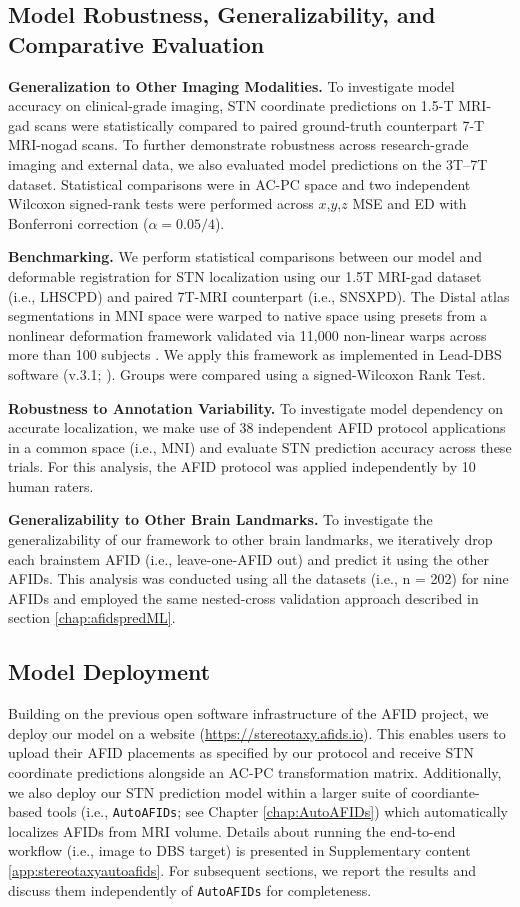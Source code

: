\subsection{Model Robustness, Generalizability, and Comparative Evaluation}

\textbf{Generalization to Other Imaging Modalities.} To investigate model accuracy on clinical-grade imaging, STN coordinate predictions on 1.5-T MRI-gad scans were statistically compared to paired ground-truth counterpart 7-T MRI-nogad scans. To further demonstrate robustness across research-grade imaging and external data, we also evaluated model predictions on the 3T–7T dataset. Statistical comparisons were in AC-PC space and two independent Wilcoxon signed-rank tests were performed across $x$,$y$,$z$ MSE and ED with Bonferroni correction ($\alpha = 0.05 / 4$).

\textbf{Benchmarking.} We perform statistical comparisons between our model and deformable registration for STN localization using our 1.5T MRI-gad dataset (i.e., LHSCPD) and paired 7T-MRI counterpart (i.e., SNSXPD). The Distal atlas segmentations in MNI space \cite{Chakravarty2006-ln, Ewert2018-bn} were warped to native space using presets from a nonlinear deformation framework validated via 11,000 non-linear warps across more than 100 subjects \cite{Ewert2019-cc}. We apply this framework as implemented in Lead-DBS software (v.3.1; \cite{Neudorfer2023-wd}). Groups were compared using a signed-Wilcoxon Rank Test.

\textbf{Robustness to Annotation Variability.} To investigate model dependency on accurate localization, we make use of 38 independent AFID protocol applications in a common space (i.e., MNI) and evaluate STN prediction accuracy across these trials. For this analysis, the AFID protocol was applied independently by 10 human raters. 

\textbf{Generalizability to Other Brain Landmarks.} To investigate the generalizability of our framework to other brain landmarks, we iteratively drop each brainstem AFID (i.e., leave-one-AFID out) and predict it using the other AFIDs. This analysis was conducted using all the datasets (i.e., n = 202) for nine AFIDs and employed the same nested-cross validation approach described in section \ref{chap:afidspredML}.

\subsection{Model Deployment}
Building on the previous open software infrastructure of the AFID project, we deploy our model on a website (\url{https://stereotaxy.afids.io}). This enables users to upload their AFID placements as specified by our protocol and receive STN coordinate predictions alongside an AC-PC transformation matrix. Additionally, we also deploy our STN prediction model within a larger suite of coordiante-based tools (i.e., \texttt{AutoAFIDs}; see Chapter \ref{chap:AutoAFIDs}) which automatically localizes AFIDs from MRI volume. Details about running the end-to-end workflow (i.e., image to DBS target) is presented in Supplementary content \ref{app:stereotaxyautoafids}. For subsequent sections, we report the results and discuss them independently of \texttt{AutoAFIDs} for completeness. 

